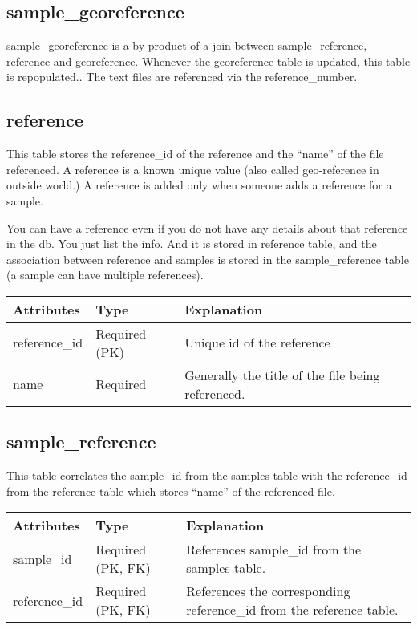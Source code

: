 \documentclass[letterpaper,10pt,english]{sphinxmanual}
\begin{document}
\subsection{sample\_georeference}
\label{Table_Description:sample-georeference}
sample\_georeference is a by product of a join between sample\_reference, reference and georeference. Whenever the georeference table is updated, this table is repopulated.. The text files are referenced via the reference\_number.


\subsection{reference}
\label{Table_Description:reference}
This table stores the reference\_id of the reference and the “name” of the file referenced.
A reference is a known unique value (also called geo-reference in outside world.)
A reference is added only when someone adds a reference for a sample.

You can have a reference even if you do not have any details about that reference in the db. You just list the info. And it is stored in reference table, and the association between reference and samples is stored in the sample\_reference table (a sample can have multiple references).

\begin{tabulary}{\linewidth}{|L|L|L|}
\hline
\textbf{
Attributes
} & \textbf{
Type
} & \textbf{
Explanation
}\\\hline

reference\_id
 & 
Required (PK)
 & 
Unique id of the reference
\\\hline

name
 & 
Required
 & 
Generally the title of the file being referenced.
\\\hline
\end{tabulary}



\subsection{sample\_reference}
\label{Table_Description:sample-reference}
This table correlates the sample\_id from the samples table with the reference\_id from the reference table which stores “name” of the referenced file.

\begin{tabulary}{\linewidth}{|L|L|L|}
\hline
\textbf{
Attributes
} & \textbf{
Type
} & \textbf{
Explanation
}\\\hline

sample\_id
 & 
Required (PK, FK)
 & 
References sample\_id from the samples table.
\\\hline

reference\_id
 & 
Required (PK, FK)
 & 
References the corresponding reference\_id from the reference table.
\\\hline
\end{tabulary}
\end{document}
